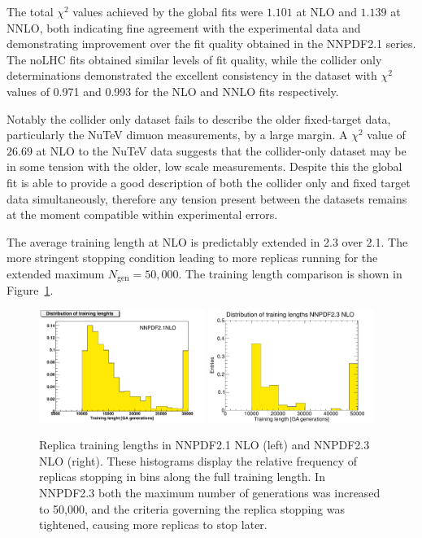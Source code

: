 The total $\chi^2$ values achieved by the global fits were $1.101$ at NLO and $1.139$ at NNLO, both indicating fine agreement with the experimental data and demonstrating improvement over the fit quality obtained in the NNPDF2.1 series. The noLHC fits obtained similar levels of fit quality, while the collider only determinations demonstrated the excellent consistency in the dataset with $\chi^2$ values of 0.971 and 0.993 for the NLO and NNLO fits respectively.

Notably the collider only dataset fails to describe the older fixed-target data, particularly the NuTeV dimuon measurements, by a large margin. A $\chi^2$ value of $26.69$ at NLO to the NuTeV data suggests that the collider-only dataset may be in some tension with the older, low scale measurements. Despite this the global fit is able to provide a good description of both the collider only and fixed target data simultaneously, therefore any tension present between the datasets remains at the moment compatible within experimental errors.

The average training length at NLO is predictably extended in 2.3 over 2.1. The more stringent stopping condition leading to more replicas running for the extended maximum $N_{\text{gen}} = 50,000$. The training length comparison is shown in Figure~\ref{fig:tlcomp}.

\begin{figure}[h!]
\centering
\includegraphics[width=0.48\textwidth]{6-LHCimpact/figs/21tl_ann.pdf}
\includegraphics[width=0.48\textwidth]{6-LHCimpact/figs/23tl.pdf}
\caption[Replica training lengths in NNPDF2.1 and NNPDF2.3]{Replica training lengths in NNPDF2.1 NLO (left) and NNPDF2.3 NLO (right). These histograms display the relative frequency of replicas stopping in bins along the full training length. In NNPDF2.3 both the maximum number of generations was increased to 50,000, and the criteria governing the replica stopping was tightened, causing more replicas to stop later. } 
\label{fig:tlcomp}
\end{figure}

